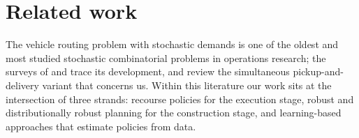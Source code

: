 \documentclass[preprint,authoryear,12pt]{elsarticle}
\theoremstyle{definition}
\theoremstyle{remark}
\begin{document}
\section{Related work}\label{sec:related}

The vehicle routing problem with stochastic demands is one of the oldest
and most studied stochastic combinatorial problems in operations
research; the surveys of \citet{gendreau1996stochastic} and
\citet{oyola2018stochastic} trace its development, and
\citet{koc2020review} review the simultaneous pickup-and-delivery
variant that concerns us. Within this literature our work sits at the
intersection of three strands: recourse policies for the execution
stage, robust and distributionally robust planning for the construction
stage, and learning-based approaches that estimate policies from data.
\end{document}
